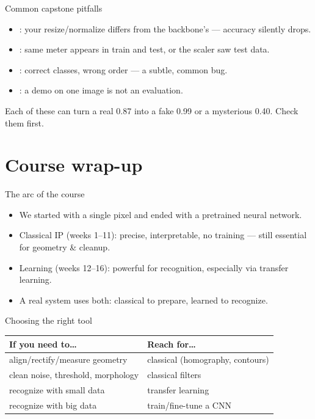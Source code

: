 \documentclass[10pt,aspectratio=169]{beamer}
\begin{document}
\begin{frame}{Common capstone pitfalls}
  \begin{itemize}
    \item {}: your resize/normalize differs from the backbone's — accuracy silently drops.
    \item {}: same meter appears in train and test, or the scaler saw test data.
    \item {}: correct classes, wrong order — a subtle, common bug.
    \item {}: a demo on one image is not an evaluation.
  \end{itemize}
  \begin{badbox}
    Each of these can turn a real 0.87 into a fake 0.99 or a mysterious 0.40. Check them first.
  \end{badbox}
\end{frame}

\section{Course wrap-up}

\begin{frame}{The arc of the course}
  \begin{itemize}
    \item We started with a single pixel and ended with a pretrained neural network.
    \item Classical IP (weeks 1--11): precise, interpretable, no training — still essential for geometry \& cleanup.
    \item Learning (weeks 12--16): powerful for recognition, especially via transfer learning.
    \item \alert{A real system uses both}: classical to prepare, learned to recognize.
  \end{itemize}
\end{frame}

\begin{frame}{Choosing the right tool}
  \begin{center}
  \begin{tabular}{@{}ll@{}}
    \toprule
    \textbf{If you need to\ldots} & \textbf{Reach for\ldots} \\
    \midrule
    align/rectify/measure geometry & classical (homography, contours) \\
    clean noise, threshold, morphology & classical filters \\
    recognize with small data & transfer learning \\
    recognize with big data & train/fine-tune a CNN \\
    \bottomrule
  \end{tabular}
  \end{center}
\end{frame}
\end{document}
